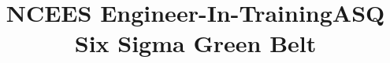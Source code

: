 \documentclass[12pt]{res} %
\begin{document}
\begin{resume}
      \vspace{0pt}

            
      \employer{}
      \title{NCEES Engineer-In-Training}
      \dates{}
      \begin{position}
          \vspace{-42pt}
      \end{position}

      \employer{}
      \title{ASQ Six Sigma Green Belt}
      \dates{}
      \begin{position}
          \vspace{-28pt}
      \end{position}

    \end{resume}

\end{document}
